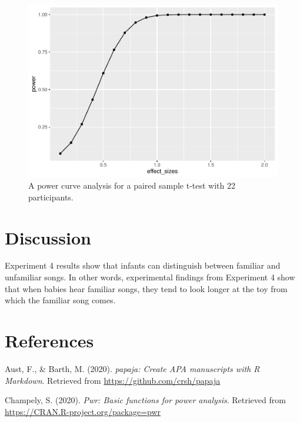 \documentclass[
  english,
  man]{apa6}
\begin{document}
\begin{figure}
\centering
\includegraphics{SemesterProject_files/figure-latex/unnamed-chunk-4-1.pdf}
\caption{\label{fig:unnamed-chunk-4}A power curve analysis for a paired sample t-test with 22 participants.}
\end{figure}

\hypertarget{discussion}{%
\section{Discussion}\label{discussion}}

Experiment 4 results show that infants can distinguish between familiar and unfamiliar songs. In other words, experimental findings from Experiment 4 show that when babies hear familiar songs, they tend to look longer at the toy from which the familiar song comes.

\newpage

\hypertarget{references}{%
\section{References}\label{references}}

\begingroup
\setlength{\parindent}{-0.5in}
\setlength{\leftskip}{0.5in}

\hypertarget{refs}{}
\leavevmode\hypertarget{ref-R-papaja}{}%
Aust, F., \& Barth, M. (2020). \emph{papaja: Create APA manuscripts with R Markdown}. Retrieved from \url{https://github.com/crsh/papaja}

\leavevmode\hypertarget{ref-R-pwr}{}%
Champely, S. (2020). \emph{Pwr: Basic functions for power analysis}. Retrieved from \url{https://CRAN.R-project.org/package=pwr}
\end{document}
